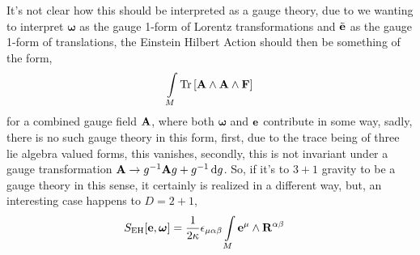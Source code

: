 It's not clear how this should be interpreted as a gauge theory, due to we wanting to interpret $\boldsymbol\omega$ as the gauge 1-form of Lorentz transformations and $\tilde{\vb e}$ as the gauge 1-form of 
translations, the Einstein Hilbert Action should then be something of the form,
\begin{align*}
    \int\limits_M\Tr\qty[\vb A\wedge\vb A\wedge\vb F]
\end{align*}
for a combined gauge field $\vb A$, where both $\boldsymbol\omega$ and $\vb e$ contribute in some way, sadly, there is no such gauge theory in this form, 
first, due to the trace being of three lie algebra valued forms, this vanishes, secondly, this is not invariant under a gauge transformation $\vb A\rightarrow g^{-1}\vb Ag+g^{-1}\dd{g}$. So, 
if it's to $3+1$ gravity to be a gauge theory in this sense, it certainly is realized in a different way, but, an interesting case happens to $D=2+1$,
\begin{align*}
    S_{\textnormal{EH}}\qty[\vb e,\boldsymbol\omega]&=\frac{1}{2\kappa}\epsilon_{\mu\alpha\beta}\int\limits_M\vb e^{\mu}\wedge\vb R^{\alpha\beta}
\end{align*}

